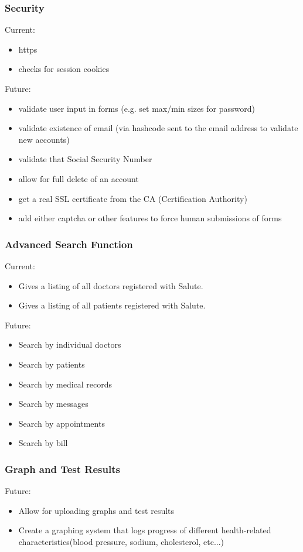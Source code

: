 \subsubsection{Security}
Current:
\begin{itemize}
\item https
\item checks for session cookies
\end{itemize}
Future: 
\begin{itemize}
\item validate user input in forms (e.g. set max/min sizes for password)
\item validate existence of email (via hashcode sent to the email address to validate new accounts)
\item validate that Social Security Number
\item allow for full delete of an account
\item get a real SSL certificate from the CA (Certification Authority)
\item add either captcha or other features to force human submissions of forms
\end{itemize}

\subsubsection{Advanced Search Function}
Current:
\begin{itemize}
\item Gives a listing of all doctors registered with Salute.
\item Gives a listing of all patients registered with Salute.
\end{itemize}
Future: 
\begin{itemize}
\item Search by individual doctors 
\item Search by patients
\item Search by medical records 
\item Search by messages
\item Search by appointments
\item Search by bill
\end{itemize}

\subsubsection{Graph and Test Results}
Future: 
\begin{itemize}
\item Allow for uploading graphs and test results
\item Create a graphing system that logs progress of different health-related characteristics(blood pressure, sodium, cholesterol, etc...)
\end{itemize}

